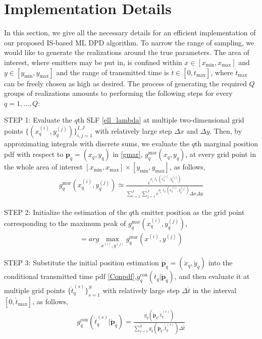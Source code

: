 \documentclass[review]{elsarticle}
\begin{document}
\section{Implementation Details}
In this section, we give all the necessary details for an efficient implementation of our proposed IS-based ML DPD algorithm. To narrow the range of sampling, we would like to generate the realizations around the true parameters. The area of interest, where emitters may be put in, is confined within $x\in [x_{\text{min}},x_{\text{max}}]$ and $y\in [y_{\text{min}},y_{\text{max}}]$ and the range of transmitted time is $\mathring{t}\in [0,\mathring{t}_{\text{max}}]$, where $\mathring{t}_{\text{max}}$ can be freely chosen as high as desired. The process of generating the required $Q$ groups of realizations amounts to performing the following steps for every $q=1,...,Q$: 

STEP 1: Evaluate the $q$th SLF \eqref{ell_lambda} at multiple two-dimensional grid points $\lbrace(x_q^{(i)},y_q^{(j)})\rbrace_{i,j=1}^{I,J}$ with relatively large step $\Delta x$ and $\Delta y$. Then, by approximating integrals with discrete sums, we evaluate the $q$th marginal position pdf with respect to $\boldsymbol{p}_q=(x_q,y_q)$ in \eqref{gmar}, $g_{q}^{\text{mar}}(x_q,y_q)$, at every grid point in the whole area of interest $[x_{\text{min}},x_{\text{max}}]\times [y_{\text{min}},y_{\text{max}}]$, as follows, 
\begin{align}\label{step1}
    g_{q}^{\text{mar}}(x_q^{(i)},y_q^{(j)})\simeq\frac{e^{\rho_1\ell_q (x_q^{(i)},y_q^{(j)})}}{\sum_{i=1}^I\sum_{j=1}^J e^{\rho_1\ell_q (x_q^{(i)},y_q^{(j)})}\Delta x\Delta y}
\end{align}

STEP 2: Initialize the estimation of the $q$th emitter position as the grid point corresponding to the maximum peak of $g_{q}^{\text{mar}}(x_q^{(i)},y_q^{(j)})$,
\begin{align}
    [\mathring{x}_q,\mathring{y}_q]=arg \max_{x^{(i)},y^{(j)}} g_{q}^{\text{mar}}(x^{(i)},y^{(j)})
\end{align}

STEP 3: Substitute the initial position estimation $\mathring{\boldsymbol{p}}_q=(\mathring{x}_q,\mathring{y}_q)$ into the conditional transmitted time pdf \eqref{Conpdf},$g_{q}^{\text{con}}(\mathring{t}_q\vert \mathring{\boldsymbol{p}}_q)$, and then evaluate it at multiple grid points $\lbrace \mathring{t}_q^{(s)} \rbrace_{s=1}^{S}$ with relatively large step $\Delta \mathring{t}$ in the interval $[0,\mathring{t}_{\text{max}}]$, as follows,
\begin{align}
    g_{q}^{\text{con}}(\mathring{t}_q^{(s)} \vert \mathring{\boldsymbol{p}}_q)=\frac{g_q(\mathring{\boldsymbol{p}}_q,\mathring{t}_q^{(s)})}{\sum_{s=1}^S g_q(\mathring{\boldsymbol{p}}_q,\mathring{t}_q^{(s)})\Delta\mathring{t}}
\end{align}
\end{document}
